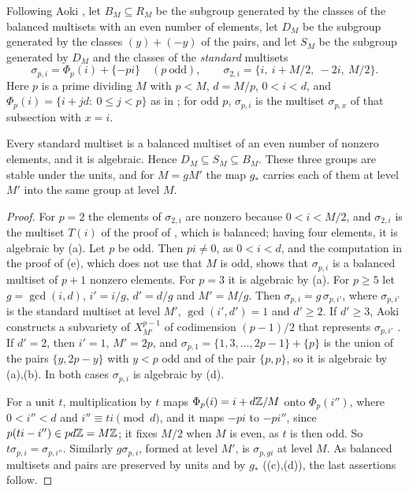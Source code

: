Following Aoki \cite[\S2]{Aok00}, let $B_{M}\subseteq R_{M}$ be the subgroup
generated by the classes of the balanced multisets with an even number of
elements, let $D_{M}$ be the subgroup generated by the classes $(y)+(-y)$ of
the pairs, and let $S_{M}$ be the subgroup generated by $D_{M}$ and the
classes of the \emph{standard} multisets
\[
  \sigma_{p,i}=\Phi_{p}(i)+\{-pi\}\quad(p\ \text{odd}),\qquad
  \sigma_{2,i}=\{i,\ i+M/2,\ -2i,\ M/2\}.
\]
Here $p$ is a prime dividing $M$ with $p<M$, $d=M/p$, $0<i<d$, and
$\Phi_{p}(i)=\{i+jd:\ 0\le j<p\}$ as in ; for odd $p$,
$\sigma_{p,i}$ is the multiset $\sigma_{p,x}$ of that subsection with $x=i$.

\begin{lemma}\label{lem:standardalg}
Every standard multiset is a balanced multiset of an even number of nonzero
elements, and it is algebraic. Hence $D_{M}\subseteq S_{M}\subseteq B_{M}$.
These three groups are stable under the units, and for $M=gM'$ the map
$g_{*}$ carries each of them at level $M'$ into the same group at level $M$.
\end{lemma}

\begin{proof}
For $p=2$ the elements of $\sigma_{2,i}$ are nonzero because $0<i<M/2$, and
$\sigma_{2,i}$ is the multiset $T(i)$ of the proof of
, which is balanced; having four elements, it is
algebraic by (a). Let $p$ be odd. Then $pi\ne0$, as
$0<i<d$, and the computation in the proof of (e), which
does not use that $M$ is odd, shows that $\sigma_{p,i}$ is a balanced
multiset of $p+1$ nonzero elements. For $p=3$ it is algebraic by
(a). For $p\ge5$ let $g=\gcd(i,d)$, $i'=i/g$, $d'=d/g$
and $M'=M/g$. Then $\sigma_{p,i}=g\,\sigma_{p,i'}$, where $\sigma_{p,i'}$ is
the standard multiset at level $M'$, $\gcd(i',d')=1$ and $d'\ge2$. If
$d'\ge3$, Aoki constructs a subvariety of $X^{p-1}_{M'}$ of codimension
$(p-1)/2$ that represents $\sigma_{p,i'}$ \cite[Theorem~2-1]{Aok87}. If
$d'=2$, then $i'=1$, $M'=2p$, and $\sigma_{p,1}=\{1,3,\dots,2p-1\}+\{p\}$ is
the union of the pairs $\{y,2p-y\}$ with $y<p$ odd and of the pair
$\{p,p\}$, so it is algebraic by (a),(b). In both cases
$\sigma_{p,i}$ is algebraic by (d).

For a unit $t$, multiplication by $t$ maps $\Phi_{p}(i)=i+d\mathbb{Z}/M$ onto
$\Phi_{p}(i'')$, where $0<i''<d$ and $i''\equiv ti\pmod d$, and it maps $-pi$
to $-pi''$, since $p(ti-i'')\in pd\mathbb{Z}=M\mathbb{Z}$; it fixes $M/2$ when $M$ is even,
as $t$ is then odd. So $t\sigma_{p,i}=\sigma_{p,i''}$. Similarly
$g\sigma_{p,i}$, formed at level $M'$, is $\sigma_{p,gi}$ at level $M$. As
balanced multisets and pairs are preserved by units and by $g_{*}$
((c),(d)), the last assertions follow.
\end{proof}

